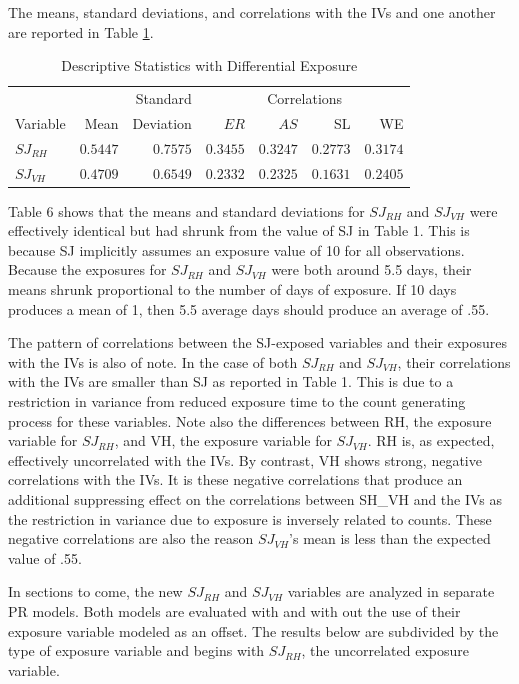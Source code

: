 \documentclass[ShortAfour,times,sageapa]{sagej}
\begin{document}
	The means, standard deviations, and correlations with the IVs and one another are reported in Table \ref{tab:dscEx}.
	
	\begin{table}[h!]
		\centering
		\caption{\centering Descriptive Statistics with Differential Exposure}
		\begin{tabular}{lrrrrrr}
			\toprule
			&  &  Standard & \multicolumn{4}{c}{Correlations} \\ 
			\cmidrule(lr){4-7}
			Variable & Mean & Deviation & $ER$ & $AS$ & SL & WE \\ 
			\midrule
			$SJ_{RH}$ & $0.5447$ & $0.7575$ & $0.3455$ & $0.3247$ & $0.2773$ & $0.3174$ \\ 
			$SJ_{VH}$ & $0.4709$ & $0.6549$ & $0.2332$ & $0.2325$ & $0.1631$ & $0.2405$ \\ 
			\bottomrule
		\end{tabular}
		\label{tab:dscEx}
	\end{table}
	
	Table 6 shows that the means and standard deviations for $SJ_{RH}$ and $SJ_{VH}$ were effectively identical but had shrunk from the value of SJ in Table 1.
	This is because SJ implicitly assumes an exposure value of 10 for all observations. 
	Because the exposures for $SJ_{RH}$ and $SJ_{VH}$ were both around 5.5 days, their means shrunk proportional to the number of days of exposure.
	If 10 days produces a mean of 1, then 5.5 average days should produce an average of .55.
	
	The pattern of correlations between the SJ-exposed variables and their exposures with the IVs is also of note. 
	In the case of both $SJ_{RH}$ and $SJ_{VH}$, their correlations with the IVs are smaller than SJ as reported in Table 1. 
	This is due to a restriction in variance from reduced exposure time to the count generating process for these variables.
	Note also the differences between RH, the exposure variable for $SJ_{RH}$, and VH, the exposure variable for $SJ_{VH}$.
	RH is, as expected, effectively uncorrelated with the IVs.
	By contrast, VH shows strong, negative correlations with the IVs.
	It is these negative correlations that produce an additional suppressing effect on the correlations between SH\_VH and the IVs as the restriction in variance due to exposure is inversely related to counts.
	These negative correlations are also the reason $SJ_{VH}$'s mean is less than  the expected value of .55.
	
	In sections to come, the new $SJ_{RH}$ and $SJ_{VH}$ variables are analyzed in separate PR models.
	Both models are evaluated with and with out the use of their exposure variable modeled as an offset.
	The results below are subdivided by the type of exposure variable and begins with $SJ_{RH}$, the uncorrelated exposure variable.
	
\end{document}

